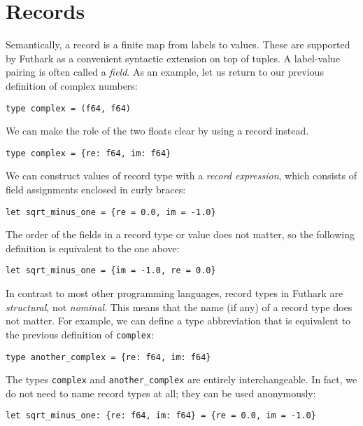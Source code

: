 \documentclass[oneside,11pt]{book}
\begin{document}
\section{Records}
\label{sec:records}

Semantically, a record is a finite map from labels to values.  These
are supported by Futhark as a convenient syntactic extension on top of
tuples.  A label-value pairing is often called a \textit{field}.  As
an example, let us return to our previous definition of complex
numbers:

\begin{lstlisting}
type complex = (f64, f64)
\end{lstlisting}

We can make the role of the two floats clear by using a record
instead.

\begin{lstlisting}
type complex = {re: f64, im: f64}
\end{lstlisting}

We can construct values of record type with a \textit{record
  expression}, which consists of field assignments enclosed in curly
braces:

\begin{lstlisting}
let sqrt_minus_one = {re = 0.0, im = -1.0}
\end{lstlisting}

The order of the fields in a record type or value does not matter, so
the following definition is equivalent to the one above:

\begin{lstlisting}
let sqrt_minus_one = {im = -1.0, re = 0.0}
\end{lstlisting}

In contrast to most other programming languages, record types in
Futhark are \textit{structural}, not \textit{nominal}.  This means
that the name (if any) of a record type does not matter.  For example,
we can define a type abbreviation that is equivalent to the previous
definition of \lstinline{complex}:

\begin{lstlisting}
type another_complex = {re: f64, im: f64}
\end{lstlisting}

The types \lstinline{complex} and \lstinline{another_complex} are
entirely interchangeable.  In fact, we do not need to name record
types at all; they can be used anonymously:

\begin{lstlisting}
let sqrt_minus_one: {re: f64, im: f64} = {re = 0.0, im = -1.0}
\end{lstlisting}
\end{document}
